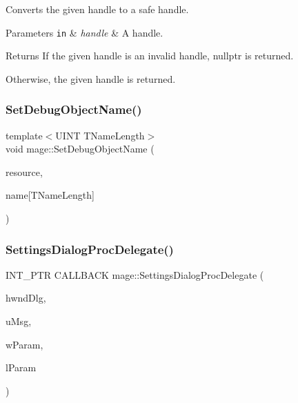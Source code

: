 Converts the given handle to a safe handle.


\begin{DoxyParams}[1]{Parameters}
\mbox{\tt in}  & {\em handle} & A handle. \\
\hline
\end{DoxyParams}
\begin{DoxyReturn}{Returns}
If the given handle is an invalid handle, {\ttfamily nullptr} is returned. 

Otherwise, the given handle is returned. 
\end{DoxyReturn}
\hypertarget{namespacemage_a88833e1a7c6ad614ff6e88cb10eff532}{}\label{namespacemage_a88833e1a7c6ad614ff6e88cb10eff532} 
\subsubsection{\texorpdfstring{Set\+Debug\+Object\+Name()}{SetDebugObjectName()}}
{\footnotesize\ttfamily template$<$U\+I\+NT T\+Name\+Length$>$ \\
void mage\+::\+Set\+Debug\+Object\+Name (\begin{DoxyParamCaption}\item[{\+\_\+\+In\+\_\+ I\+D3\+D11\+Device\+Child $\ast$}]{resource,  }\item[{\+\_\+\+In\+\_\+ const char(\&)}]{name\mbox{[}\+T\+Name\+Length\mbox{]} }\end{DoxyParamCaption})}

\hypertarget{namespacemage_a6b352e8d2bf3eeccf1a5dec3f1cf4130}{}\label{namespacemage_a6b352e8d2bf3eeccf1a5dec3f1cf4130} 
\subsubsection{\texorpdfstring{Settings\+Dialog\+Proc\+Delegate()}{SettingsDialogProcDelegate()}}
{\footnotesize\ttfamily I\+N\+T\+\_\+\+P\+TR C\+A\+L\+L\+B\+A\+CK mage\+::\+Settings\+Dialog\+Proc\+Delegate (\begin{DoxyParamCaption}\item[{H\+W\+ND}]{hwnd\+Dlg,  }\item[{U\+I\+NT}]{u\+Msg,  }\item[{W\+P\+A\+R\+AM}]{w\+Param,  }\item[{L\+P\+A\+R\+AM}]{l\+Param }\end{DoxyParamCaption})}

